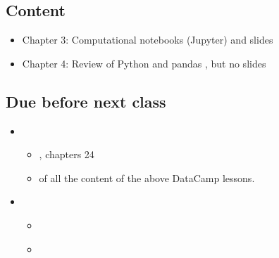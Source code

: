 \documentclass[letterpaper,10pt,english]{jupyterBook}
\begin{document}
\subsection{Content}
\label{\detokenize{course-schedule:id1}}\begin{itemize}
\item {} 
\sphinxAtStartPar
Chapter 3: Computational notebooks (Jupyter) \sphinxhyphen{} {\hyperref[\detokenize{chapter-3-jupyter::doc}]{}} and slides

\item {} 
\sphinxAtStartPar
Chapter 4: Review of Python and pandas \sphinxhyphen{} {\hyperref[\detokenize{chapter-4-review-of-python-and-pandas::doc}]{}}, but no slides

\end{itemize}


\subsection{Due before next class}
\label{\detokenize{course-schedule:id2}}\begin{itemize}
\item {} 
\sphinxAtStartPar
{}
\begin{itemize}
\item {} 
\sphinxAtStartPar
{}, chapters 2\sphinxhyphen{}4

\item {} 
\sphinxAtStartPar
{} of all the content of the above DataCamp lessons.

\end{itemize}

\item {} 
\sphinxAtStartPar
{}
\begin{itemize}
\item {} 
\sphinxAtStartPar
{\hyperref[\detokenize{chapter-5-before-and-after::doc}]{}}

\item {} 
\sphinxAtStartPar
{\hyperref[\detokenize{chapter-6-single-table-verbs::doc}]{}}

\end{itemize}

\end{itemize}
\end{document}
